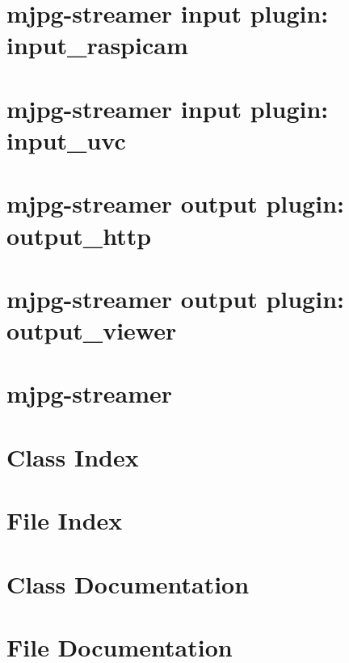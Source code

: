 \documentclass[twoside]{book}
\newcommand{\+}{\discretionary{\mbox{\scriptsize$\hookleftarrow$}}{}{}}
\begin{document}
\chapter{mjpg-\/streamer input plugin\+: input\+\_\+raspicam}
\label{md_raspi-server_mjpg-streamer_plugins_input_raspicam_README}
\hypertarget{md_raspi-server_mjpg-streamer_plugins_input_raspicam_README}{}

\chapter{mjpg-\/streamer input plugin\+: input\+\_\+uvc}
\label{md_raspi-server_mjpg-streamer_plugins_input_uvc_README}
\hypertarget{md_raspi-server_mjpg-streamer_plugins_input_uvc_README}{}

\chapter{mjpg-\/streamer output plugin\+: output\+\_\+http}
\label{md_raspi-server_mjpg-streamer_plugins_output_http_README}
\hypertarget{md_raspi-server_mjpg-streamer_plugins_output_http_README}{}

\chapter{mjpg-\/streamer output plugin\+: output\+\_\+viewer}
\label{md_raspi-server_mjpg-streamer_plugins_output_viewer_README}
\hypertarget{md_raspi-server_mjpg-streamer_plugins_output_viewer_README}{}

\chapter{mjpg-\/streamer}
\label{md_raspi-server_mjpg-streamer_README}
\hypertarget{md_raspi-server_mjpg-streamer_README}{}

\chapter{Class Index}

\chapter{File Index}

\chapter{Class Documentation}


\chapter{File Documentation}






\newpage
{}
{}
\printindex
\end{document}
